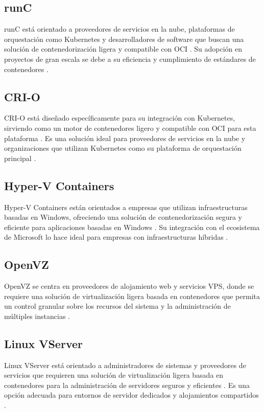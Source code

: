 \subsection*{runC}
runC está orientado a proveedores de servicios en la nube, plataformas de orquestación como Kubernetes y desarrolladores de software que buscan una solución de contenedorización ligera y compatible con OCI \citep{Perez2005}. Su adopción en proyectos de gran escala se debe a su eficiencia y cumplimiento de estándares de contenedores \citep{151962df5f7e4b9faba0629540c11439}.

\subsection*{CRI-O}
CRI-O está diseñado específicamente para su integración con Kubernetes, sirviendo como un motor de contenedores ligero y compatible con OCI para esta plataforma \citep{CNCF2019}. Es una solución ideal para proveedores de servicios en la nube y organizaciones que utilizan Kubernetes como su plataforma de orquestación principal \citep{151962df5f7e4b9faba0629540c11439}.

\subsection*{Hyper-V Containers}
Hyper-V Containers están orientados a empresas que utilizan infraestructuras basadas en Windows, ofreciendo una solución de contenedorización segura y eficiente para aplicaciones basadas en Windows \citep{Smith2016}. Su integración con el ecosistema de Microsoft lo hace ideal para empresas con infraestructuras híbridas \citep{Clark2024}.

\subsection*{OpenVZ}
OpenVZ se centra en proveedores de alojamiento web y servicios VPS, donde se requiere una solución de virtualización ligera basada en contenedores que permita un control granular sobre los recursos del sistema y la administración de múltiples instancias \citep{OpenVZ2015}.

\subsection*{Linux VServer}
Linux VServer está orientado a administradores de sistemas y proveedores de servicios que requieren una solución de virtualización ligera basada en contenedores para la administración de servidores seguros y eficientes \citep{10.1145/1272996.1273025}. Es una opción adecuada para entornos de servidor dedicados y alojamientos compartidos \citep{LinuxVirt2017}.


